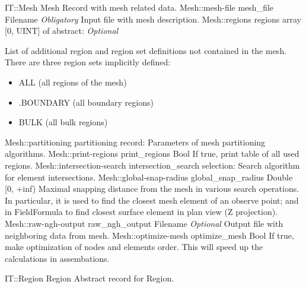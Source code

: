 \begin{RecordType}
	{IT::Mesh}
	{Mesh}
	{}%
	{}%
	{{{Record with mesh related data.}%
}}
		\RecKey
			{Mesh::mesh-file}
			{mesh{\_}file}
			{{Filename}}{}
			{ \it{Obligatory}}
			{{{Input file with mesh description.}%
}}
		\RecKey
			{Mesh::regions}
			{regions}
			{{array [0, UINT] of }{abstract: }}{}
			{ \it{Optional}}
			{{{{List of additional region and region set definitions not contained in the mesh.
There are three region sets implicitly defined:}
% 
}
\begin{itemize}
\item {ALL (all regions of the mesh)}
\item {.BOUNDARY (all boundary regions)}
\item {BULK (all bulk regions)}
\end{itemize}
}}
		\RecKey
			{Mesh::partitioning}
			{partitioning}
			{{record: }}{}
			{ }
			{{{Parameters of mesh partitioning algorithms.}%
}}
		\RecKey
			{Mesh::print-regions}
			{print{\_}regions}
			{{Bool}}{}
			{ }
			{{{If true, print table of all used regions.}%
}}
		\RecKey
			{Mesh::intersection-search}
			{intersection{\_}search}
			{{selection: }}{}
			{ }
			{{{Search algorithm for element intersections.}%
}}
		\RecKey
			{Mesh::global-snap-radius}
			{global{\_}snap{\_}radius}
			{{Double [0, +inf)}}{}
			{ }
			{{{Maximal snapping distance from the mesh in various search operations.
In particular, it is used to find the closest mesh element of an observe point; and in FieldFormula to find closest surface element in plan view (Z projection).}%
}}
		\RecKey
			{Mesh::raw-ngh-output}
			{raw{\_}ngh{\_}output}
			{{Filename}}{}
			{ \it{Optional}}
			{{{Output file with neighboring data from mesh.}%
}}
		\RecKey
			{Mesh::optimize-mesh}
			{optimize{\_}mesh}
			{{Bool}}{}
			{ }
			{{{If true, make optimization of nodes and elements order.
This will speed up the calculations in assembations.}%
}}
\end{RecordType}
\begin{AbstractType}
	{IT::Region}
	{Region}
	{}
	{{{Abstract record for Region.}%
}}
\end{AbstractType}
